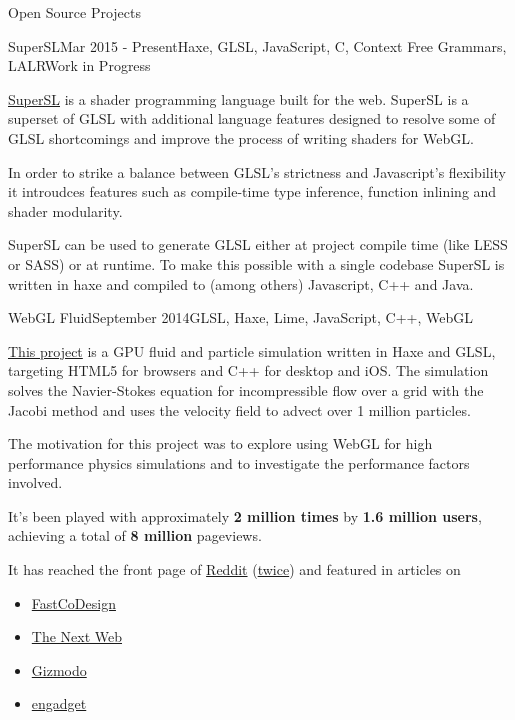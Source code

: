 \documentclass{resume} %
\begin{document}
\begin{rSection}{Open Source Projects}

\begin{rSubsection}{SuperSL}{Mar 2015 - Present}{Haxe, GLSL, JavaScript, C, Context Free Grammars, LALR}{Work in Progress}
\item \href{https://github.com/haxiomic/supersl}{SuperSL} is a shader programming language built for the web. SuperSL is a superset of GLSL with additional language features designed to resolve some of GLSL shortcomings and improve the process of writing shaders for WebGL.
\item In order to strike a balance between GLSL's strictness and Javascript's flexibility it introudces features such as compile-time type inference, function inlining and shader modularity.
\item SuperSL can be used to generate GLSL either at project compile time (like LESS or SASS) or at runtime. To make this possible with a single codebase SuperSL is written in haxe and compiled to (among others) Javascript, C++ and Java.
\end{rSubsection}

\begin{rSubsection}{WebGL Fluid}{September 2014}{GLSL, Haxe, Lime, JavaScript, C++, WebGL}{}
\item \href{https://github.com/haxiomic/GPU-Fluid-Experiments}{This project} is a GPU fluid and particle simulation written in Haxe and GLSL, targeting HTML5 for browsers and C++ for desktop and iOS. The simulation solves the Navier-Stokes equation for incompressible flow over a grid with the Jacobi method and uses the velocity field to advect over 1 million particles.
\item The motivation for this project was to explore using WebGL for high performance physics simulations and to investigate the performance factors involved.
\item It's been played with approximately \textbf{2 million times} by \textbf{1.6 million users}, achieving a total of \textbf{8 million} pageviews.
\item It has reached the front page of \href{https://www.reddit.com/r/InternetIsBeautiful/comments/2gkunq/fluid_and_particles_in_webgl/}{Reddit} (\href{https://www.reddit.com/r/InternetIsBeautiful/comments/35s6hg/in_browser_physics_simulator_xpost_pc_master_race/}{twice}) and featured in articles on
\begin{itemize}
	\item \href{http://www.fastcodesign.com/3038725/this-wonderful-web-toy-turns-your-browser-into-magic-liquid}{FastCoDesign}
	\item \href{http://thenextweb.com/creativity/2015/05/15/webgl-fluid-experiment-is-a-browser-based-lsd-trip/}{The Next Web}
	\item \href{http://www.gizmodo.co.uk/2014/11/just-try-and-stop-playing-with-this-fluid-simulator/}{Gizmodo}
	\item \href{http://www.engadget.com/2015/05/15/GPU-physics-trippy-simulation/}{engadget}
\end{itemize}
\end{rSubsection}
	
\end{rSection}
\end{document}
